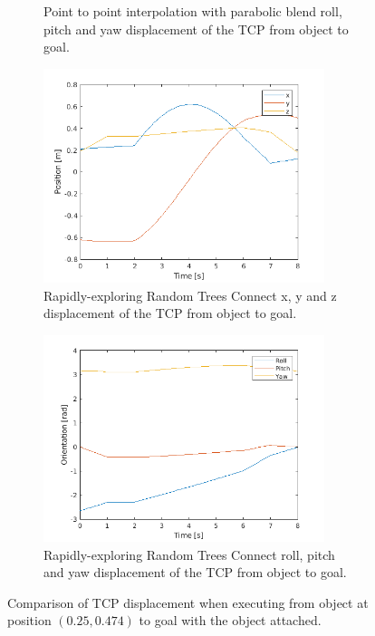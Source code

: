 \documentclass[../main.tex]{subfiles}
\begin{document}
\begin{figure}[H]
\begin{subfigure}[t]{0.49\textwidth}
        \caption{Point to point interpolation with parabolic blend roll, pitch and yaw displacement of the TCP from object to goal.}
        \label{subfig:p2p_parabolic_rpy}
    \end{subfigure}
    \begin{subfigure}[t]{0.49\textwidth}
        \centering
        \captionsetup{width=.9\textwidth}
        \includegraphics[width=0.9\textwidth]{figures/robot_motion_planning/rrt_connect/xyz.png}
        \caption{Rapidly-exploring Random Trees Connect x, y and z displacement of the TCP from object to goal.}
        \label{subfig:rrt_xyz}
    \end{subfigure}
    \begin{subfigure}[t]{0.49\textwidth}
        \centering
        \captionsetup{width=0.9\textwidth}
        \includegraphics[width=0.9\textwidth]{figures/robot_motion_planning/rrt_connect/rpy.png}
        \caption{Rapidly-exploring Random Trees Connect roll, pitch and yaw displacement of the TCP from object to goal.}
        \label{subfig::rrt_xyz}
    \end{subfigure}
    \caption{Comparison of TCP displacement when executing from object at position $(0.25, 0.474)$ to goal with the object attached.}
    \label{fig:comp_tcp}
\end{figure}
\end{document}

